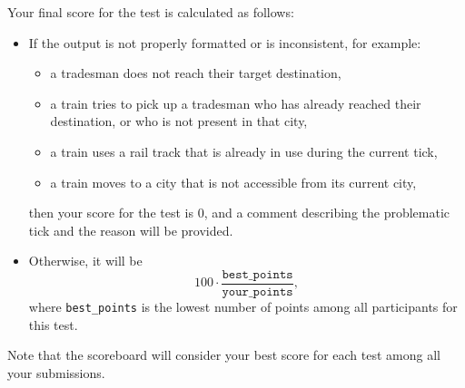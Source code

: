 \documentclass[11pt]{article}
\begin{document}
Your final score for the test is calculated as follows:
\begin{itemize}
    \item If the output is not properly formatted or is inconsistent, for example:
    \begin{itemize}
        \item a tradesman does not reach their target destination,
        \item a train tries to pick up a tradesman who has already reached their destination, or who is not present in that city,
        \item a train uses a rail track that is already in use during the current tick,
        \item a train moves to a city that is not accessible from its current city,
    \end{itemize}
    then your score for the test is $0$, and a comment describing the problematic tick and the reason will be provided.
    
    \item Otherwise, it will be
    \[
    100 \cdot \frac{\texttt{best\_points}}{\texttt{your\_points}},
    \]
    where \texttt{best\_points} is the lowest number of points among all participants for this test.
\end{itemize}

Note that the scoreboard will consider your best score for each test among all your submissions.
\end{document}
